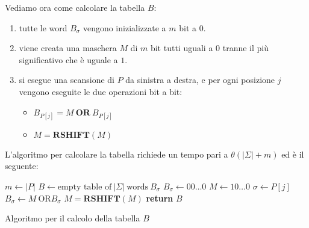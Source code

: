 Vediamo ora come calcolare la tabella $B$:
\begin{enumerate}
    \item tutte le word $B_{\sigma}$ vengono inizializzate a $m$ bit a $0$.
    \item viene creata una maschera $M$ di $m$ bit tutti uguali a $0$ tranne il
          più significativo che è uguale a $1$.
    \item si esegue una scansione di $P$ da sinistra a destra, e per ogni posizione
          $j$ vengono eseguite le due operazioni bit a bit:
          \begin{itemize}
              \item $B_{P[j]} = M \ \textbf{OR} \ B_{P[j]}$
              \item $M = \textbf{RSHIFT} (M)$
          \end{itemize}
\end{enumerate}
L'algoritmo per calcolare la tabella richiede un tempo pari a $\theta(|\Sigma| + m)$ ed è il seguente:
\begin{algorithm}
    \begin{algorithmic}
        \State $m \gets |P|$
        \State $B \gets \text{empty table of} \ |\Sigma| \ \text{words} \ B_{\sigma}$
        \For{$\sigma \in \Sigma$}
        \State $B_{\sigma} \gets 00\dots0$
        \EndFor
        \State $M \gets 10\dots0$
        \For{$\sigma \in \Sigma$}
        \State $\sigma \gets P[j]$
        \State $B_{\sigma} \gets M \ \text{OR} B_{\sigma}$
        \State $M = \textbf{RSHIFT} (M)$
        \EndFor
        \State \textbf{return} $B$
        \EndFunction
    \end{algorithmic}
    \caption{Algoritmo per il calcolo della tabella $B$}
\end{algorithm}
